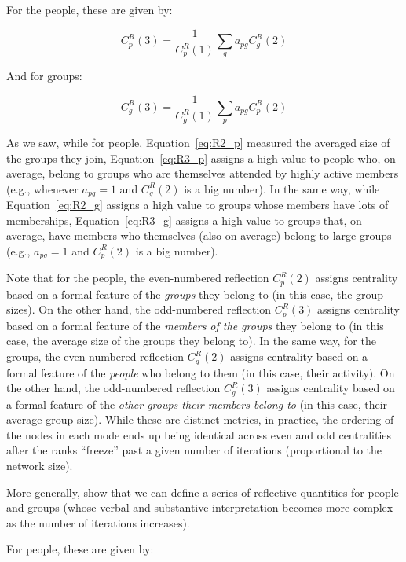 \documentclass[a4paper,fleqn]{cas-sc}
\begin{document}
For the people, these are given by:

\begin{equation}
   C^R_p(3) = \frac{1}{C^R_p(1)}\sum_g a_{pg}C^R_g(2)
   \label{eq:R3_p}
\end{equation}

And for groups:

\begin{equation}
   C^R_g(3) = \frac{1}{C^R_g(1)}\sum_p a_{pg}C^R_p(2)
   \label{eq:R3_g}
\end{equation}

As we saw, while for people, Equation~\ref{eq:R2_p} measured the averaged size of the groups they join, Equation~\ref{eq:R3_p} assigns a high value to people who, on average, belong to groups who are themselves attended by highly active members (e.g., whenever $a_{pg} = 1$ and $C^R_g(2)$ is a big number). In the same way, while Equation~\ref{eq:R2_g} assigns a high value to groups whose members have lots of memberships, Equation~\ref{eq:R3_g} assigns a high value to groups that, on average, have members who themselves (also on average) belong to large groups (e.g., $a_{pg} = 1$ and $C^R_p(2)$ is a big number).

Note that for the people, the even-numbered reflection $C^R_p(2)$ assigns centrality based on a formal feature of the \textit{groups} they belong to (in this case, the group sizes). On the other hand, the odd-numbered reflection $C^R_p(3)$ assigns centrality based on a formal feature of the \textit{members of the groups} they belong to (in this case, the average size of the groups they belong to). In the same way, for the groups, the even-numbered reflection $C^R_g(2)$ assigns centrality based on a formal feature of the \textit{people} who belong to them (in this case, their activity). On the other hand, the odd-numbered reflection $C^R_g(3)$ assigns centrality based on a formal feature of the \textit{other groups their members belong to} (in this case, their average group size). While these are distinct metrics, in practice, the ordering of the nodes in each mode ends up being identical across even and odd centralities after the ranks ``freeze'' past a given number of iterations (proportional to the network size). 

More generally, \citet{hidalgo2009building} show that we can define a series of reflective quantities for people and groups (whose verbal and substantive interpretation becomes more complex as the number of iterations increases). 

For people, these are given by:
\end{document}

